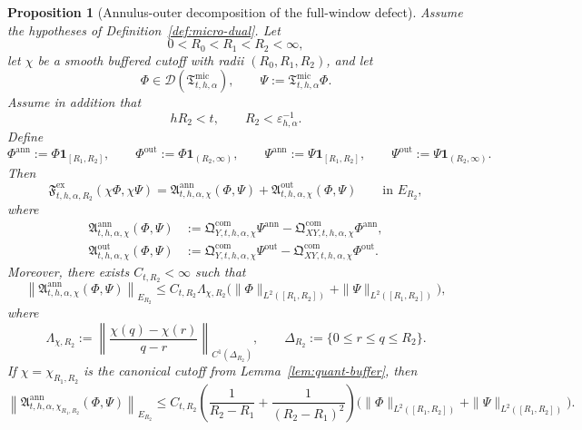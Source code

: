 \documentclass[11pt,a4paper]{amsart}
\theoremstyle{plain}
\newtheorem{proposition}[theorem]{Proposition}
\theoremstyle{definition}
\theoremstyle{remark}
\newcommand{\one}{\mathbf 1}
\begin{document}
\begin{proposition}[Annulus-outer decomposition of the full-window defect]
\label{prop:defect-split}
Assume the hypotheses of Definition~\ref{def:micro-dual}. Let
\[
0<R_0<R_1<R_2<\infty,
\]
let \(\chi\) be a smooth buffered cutoff with radii \((R_0,R_1,R_2)\), and let
\[
\Phi\in\mathcal D(\mathfrak T_{t,h,\alpha}^{\mathrm{mic}}),
\qquad
\Psi:=\mathfrak T_{t,h,\alpha}^{\mathrm{mic}}\Phi.
\]
Assume in addition that
\[
hR_2<t,
\qquad
R_2<\varepsilon_{h,\alpha}^{-1}.
\]
Define
\[
\Phi^{\mathrm{ann}}:=\Phi\one_{[R_1,R_2]},
\qquad
\Phi^{\mathrm{out}}:=\Phi\one_{(R_2,\infty)},
\qquad
\Psi^{\mathrm{ann}}:=\Psi\one_{[R_1,R_2]},
\qquad
\Psi^{\mathrm{out}}:=\Psi\one_{(R_2,\infty)}.
\]
Then
\begin{equation}\label{eq:defect-split}
\mathfrak F_{t,h,\alpha,R_2}^{\mathrm{ex}}(\chi\Phi,\chi\Psi)
=
\mathfrak A_{t,h,\alpha,\chi}^{\mathrm{ann}}(\Phi,\Psi)
+
\mathfrak A_{t,h,\alpha,\chi}^{\mathrm{out}}(\Phi,\Psi)
\qquad\text{in }E_{R_2},
\end{equation}
where
\begin{align}
\mathfrak A_{t,h,\alpha,\chi}^{\mathrm{ann}}(\Phi,\Psi)
&:=
\mathfrak Q_{Y,t,h,\alpha,\chi}^{\mathrm{com}}\Psi^{\mathrm{ann}}
-
\mathfrak Q_{XY,t,h,\alpha,\chi}^{\mathrm{com}}\Phi^{\mathrm{ann}},
\label{eq:defect-annulus}\\
\mathfrak A_{t,h,\alpha,\chi}^{\mathrm{out}}(\Phi,\Psi)
&:=
\mathfrak Q_{Y,t,h,\alpha,\chi}^{\mathrm{com}}\Psi^{\mathrm{out}}
-
\mathfrak Q_{XY,t,h,\alpha,\chi}^{\mathrm{com}}\Phi^{\mathrm{out}}.
\label{eq:defect-outer}
\end{align}
Moreover, there exists \(C_{t,R_2}<\infty\) such that
\begin{equation}\label{eq:defect-annulus-bound}
\left\|
\mathfrak A_{t,h,\alpha,\chi}^{\mathrm{ann}}(\Phi,\Psi)
\right\|_{E_{R_2}}
\le
C_{t,R_2}\Lambda_{\chi,R_2}
\bigl(
\|\Phi\|_{L^2([R_1,R_2])}
+
\|\Psi\|_{L^2([R_1,R_2])}
\bigr),
\end{equation}
where
\[
\Lambda_{\chi,R_2}:=
\left\|
\frac{\chi(q)-\chi(r)}{q-r}
\right\|_{C^1(\Delta_{R_2})},
\qquad
\Delta_{R_2}:=\{0\le r\le q\le R_2\}.
\]
If \(\chi=\chi_{R_1,R_2}\) is the canonical cutoff from Lemma~\ref{lem:quant-buffer}, then
\begin{equation}\label{eq:defect-annulus-width}
\left\|
\mathfrak A_{t,h,\alpha,\chi_{R_1,R_2}}^{\mathrm{ann}}(\Phi,\Psi)
\right\|_{E_{R_2}}
\le
C_{t,R_2}
\left(
\frac{1}{R_2-R_1}
+
\frac{1}{(R_2-R_1)^2}
\right)
\bigl(
\|\Phi\|_{L^2([R_1,R_2])}
+
\|\Psi\|_{L^2([R_1,R_2])}
\bigr).
\end{equation}
\end{proposition}
\end{document}
